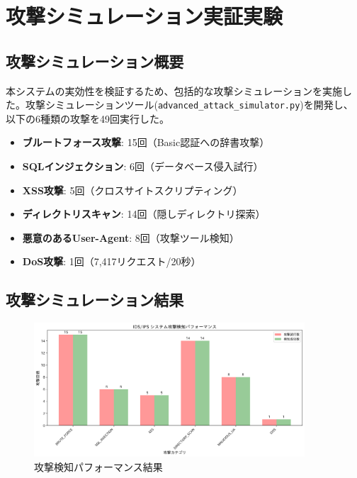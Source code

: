 \documentclass[12pt,a4paper]{article}
\begin{document}
\section{攻撃シミュレーション実証実験}

\subsection{攻撃シミュレーション概要}

本システムの実効性を検証するため、包括的な攻撃シミュレーションを実施した。攻撃シミュレーションツール(\texttt{advanced\_attack\_simulator.py})を開発し、以下の6種類の攻撃を49回実行した。

\begin{itemize}
    \item \textbf{ブルートフォース攻撃}: 15回（Basic認証への辞書攻撃）
    \item \textbf{SQLインジェクション}: 6回（データベース侵入試行）
    \item \textbf{XSS攻撃}: 5回（クロスサイトスクリプティング）
    \item \textbf{ディレクトリスキャン}: 14回（隠しディレクトリ探索）
    \item \textbf{悪意のあるUser-Agent}: 8回（攻撃ツール検知）
    \item \textbf{DoS攻撃}: 1回（7,417リクエスト/20秒）
\end{itemize}

\subsection{攻撃シミュレーション結果}

\begin{figure}[H]
\centering
\includegraphics[width=0.9\textwidth]{output/attack_simulation_performance.png}
\caption{攻撃検知パフォーマンス結果}
\label{fig:attack_performance}
\end{figure}
\end{document}

